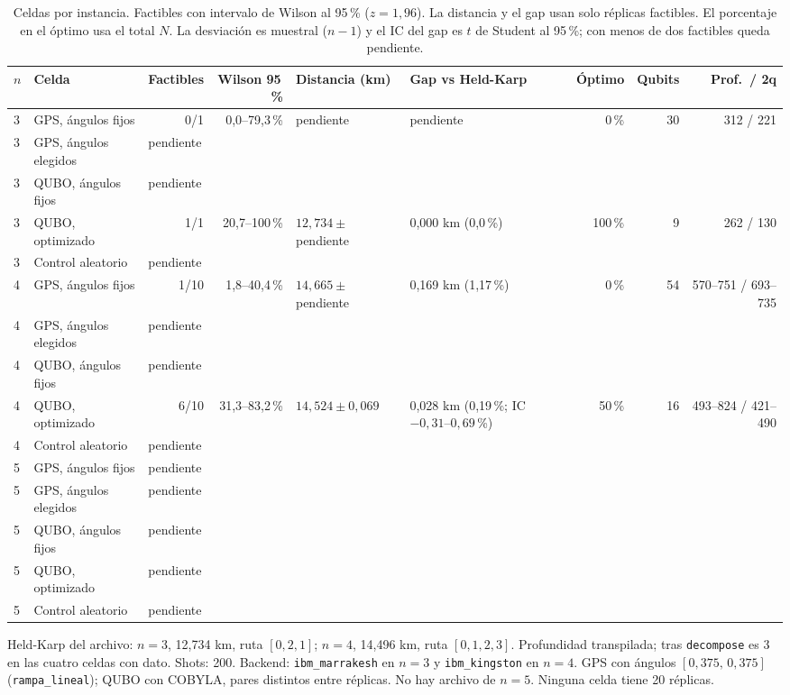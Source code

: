 \documentclass{article}
\begin{document}
\begin{table}[ht]
\centering
\small
\caption{Celdas por instancia. Factibles con intervalo de Wilson al 95\,\% ($z=1{,}96$).
La distancia y el gap usan solo réplicas factibles. El porcentaje en el óptimo usa el total $N$.
La desviación es muestral ($n-1$) y el IC del gap es $t$ de Student al 95\,\%; con menos de dos factibles queda pendiente.}
\label{tab:produccion}
\begin{tabular}{@{}llrrllrrr@{}}
\toprule
$n$ & Celda & Factibles & Wilson 95\,\% & Distancia (km) & Gap vs Held-Karp & Óptimo & Qubits & Prof.\ / 2q \\
\midrule
3 & GPS, ángulos fijos & 0/1 & 0{,}0--79{,}3\,\% & pendiente & pendiente & 0\,\% & 30 & 312 / 221 \\
3 & GPS, ángulos elegidos & \multicolumn{7}{l}{pendiente} \\
3 & QUBO, ángulos fijos & \multicolumn{7}{l}{pendiente} \\
3 & QUBO, optimizado & 1/1 & 20{,}7--100\,\% & $12{,}734 \pm$ pendiente & 0{,}000 km (0{,}0\,\%) & 100\,\% & 9 & 262 / 130 \\
3 & Control aleatorio & \multicolumn{7}{l}{pendiente} \\
\midrule
4 & GPS, ángulos fijos & 1/10 & 1{,}8--40{,}4\,\% & $14{,}665 \pm$ pendiente & 0{,}169 km (1{,}17\,\%) & 0\,\% & 54 & 570--751 / 693--735 \\
4 & GPS, ángulos elegidos & \multicolumn{7}{l}{pendiente} \\
4 & QUBO, ángulos fijos & \multicolumn{7}{l}{pendiente} \\
4 & QUBO, optimizado & 6/10 & 31{,}3--83{,}2\,\% & $14{,}524 \pm 0{,}069$ & 0{,}028 km (0{,}19\,\%; IC $-0{,}31$--$0{,}69$\,\%) & 50\,\% & 16 & 493--824 / 421--490 \\
4 & Control aleatorio & \multicolumn{7}{l}{pendiente} \\
\midrule
5 & GPS, ángulos fijos & \multicolumn{7}{l}{pendiente} \\
5 & GPS, ángulos elegidos & \multicolumn{7}{l}{pendiente} \\
5 & QUBO, ángulos fijos & \multicolumn{7}{l}{pendiente} \\
5 & QUBO, optimizado & \multicolumn{7}{l}{pendiente} \\
5 & Control aleatorio & \multicolumn{7}{l}{pendiente} \\
\bottomrule
\end{tabular}
\end{table}

\noindent Held-Karp del archivo: $n=3$, 12{,}734 km, ruta $[0,2,1]$;
$n=4$, 14{,}496 km, ruta $[0,1,2,3]$.
Profundidad transpilada; tras \texttt{decompose} es 3 en las cuatro celdas con dato.
Shots: 200. Backend: \texttt{ibm\_marrakesh} en $n=3$ y \texttt{ibm\_kingston} en $n=4$.
GPS con ángulos $[0{,}375,\,0{,}375]$ (\texttt{rampa\_lineal}); QUBO con COBYLA, pares distintos entre réplicas.
No hay archivo de $n=5$. Ninguna celda tiene 20 réplicas.
\end{document}
